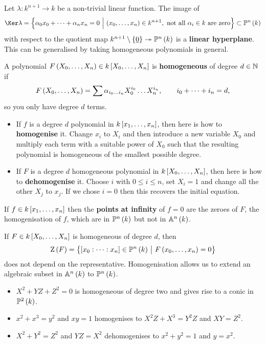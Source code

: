 Let $ \lambda : k^{n + 1} \to k $ be a non-trivial linear function. The image of
$$ \Ker \lambda = \cbr{\alpha_0x_0 + \dots + \alpha_nx_n = 0 \st \br{x_0, \dots, x_n} \in k^{n + 1}, \ \text{not all} \ \alpha_i \in k \ \text{are zero}} \subset \PP^n\br{k} $$
with respect to the quotient map $ k^{n + 1} \setminus \cbr{\underline{0}} \twoheadrightarrow \PP^n\br{k} $ is a \textbf{linear hyperplane}. This can be generalised by taking homogeneous polynomials in general.

\begin{definition}
A polynomial $ F\br{X_0, \dots, X_n} \in k\sbr{X_0, \dots, X_n} $ is \textbf{homogeneous} of degree $ d \in \mathbb{N} $ if
$$ F\br{X_0, \dots, X_n} = \sum \alpha_{i_0 \dots i_n}X_0^{i_0} \dots X_n^{i_n}, \qquad i_0 + \dots + i_n = d, $$
so you only have degree $ d $ terms.
\begin{itemize}
\item If $ f $ is a degree $ d $ polynomial in $ k\sbr{x_1, \dots, x_n} $, then here is how to \textbf{homogenise} it. Change $ x_i $ to $ X_i $ and then introduce a new variable $ X_0 $ and multiply each term with a suitable power of $ X_0 $ such that the resulting polynomial is homogeneous of the smallest possible degree.
\item If $ F $ is a degree $ d $ homogeneous polynomial in $ k\sbr{X_0, \dots, X_n} $, then here is how to \textbf{dehomogenise} it. Choose $ i $ with $ 0 \le i \le n $, set $ X_i = 1 $ and change all the other $ X_j $ to $ x_j $. If we chose $ i = 0 $ then this recovers the initial equation.
\end{itemize}
If $ f \in k\sbr{x_1, \dots, x_n} $ then the \textbf{points at infinity} of $ f = 0 $ are the zeroes of $ F $, the homogenisation of $ f $, which are in $ \PP^n\br{k} $ but not in $ \AA^n\br{k} $.
\end{definition}

If $ F \in k\sbr{X_0, \dots, X_n} $ is homogeneous of degree $ d $, then
$$ \Z\br{F} = \cbr{\sbr{x_0 : \dots : x_n} \in \PP^n\br{k} \st F\br{x_0, \dots, x_n} = 0} $$
does not depend on the representative. Homogenisation allows us to extend an algebraic subset in $ \AA^n\br{k} $ to $ \PP^n\br{k} $.

\begin{example*}
\hfill
\begin{itemize}
\item $ X^2 + YZ + Z^2 = 0 $ is homogeneous of degree two and gives rise to a conic in $ \PP^2\br{k} $.
\item $ x^2 + x^3 = y^2 $ and $ xy = 1 $ homogenises to $ X^2Z + X^3 = Y^2Z $ and $ XY = Z^2 $.
\item $ X^2 + Y^2 = Z^2 $ and $ YZ = X^2 $ dehomogenises to $ x^2 + y^2 = 1 $ and $ y = x^2 $.
\end{itemize}
\end{example*}

